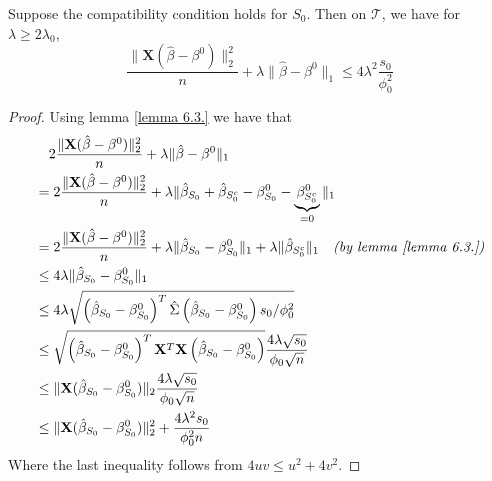 \begin{theorem}[Theorem 6.1.]
    Suppose the compatibility condition holds for $S_{0}$. Then on $\mathscr{T}$, we have for $\lambda \geq 2 \lambda_{0}$,
    $$
        \frac{\|\mathbf{X}(\hat{\beta}-\beta^{0})\|_{2}^{2}}{n}+\lambda\|\hat{\beta}-\beta^{0}\|_{1} \leq 4 \lambda^{2} \frac{s_{0}}{\phi_{0}^{2}}
    $$
\end{theorem}
\begin{proof}
    Using lemma \ref{lemma 6.3.} we have that
    \begin{align*}
         & \quad 2 \frac{\|\mathbf{X}(\hat{\beta}-\beta^{0})\|_{2}^{2}}{n} + \lambda\|\hat{\beta}-\beta^{0}\|_{1}                                                                                                   \\
         & = 2 \frac{\|\mathbf{X}(\hat{\beta}-\beta^{0})\|_{2}^{2}}{n} + \lambda \| \hat{\beta}_{S_0} + \hat{\beta}_{S_{0}^{c}} - \beta^{0}_{S_0} - \underbrace{\beta^{0}_{S_0^c}}_{=0} \|_{1}                      \\
         & = 2 \frac{\|\mathbf{X}(\hat{\beta}-\beta^{0})\|_{2}^{2}}{n} + \lambda \| \hat{\beta}_{S_0} - \beta^{0}_{S_0} \|_{1} + \lambda \| \hat{\beta}_{S_{0}^{c}} \|_1 \quad \textit{(by lemma \ref{lemma 6.3.})} \\
         & \leq 4 \lambda \|\hat{\beta}_{S_{0}} - \beta_{S_{0}}^{0} \|_{1}                                                                                                                                          \\
         & \leq 4 \lambda \sqrt{\left( \hat{\beta}_{S_{0}} - \beta_{S_{0}}^{0} \right)^{T} \hat{\Sigma} \left( \hat{\beta}_{S_{0}} - \beta_{S_{0}}^{0}  \right) s_{0} / \phi_{0}^{2}}                               \\
         & \leq \sqrt{\left( \hat{\beta}_{S_{0}} - \beta_{S_{0}}^{0} \right)^{T} \mathbf{X}^T \mathbf{X} \left( \hat{\beta}_{S_{0}} - \beta_{S_{0}}^{0}  \right)} \frac{4 \lambda \sqrt{s_{0}}}{\phi_{0} \sqrt{n}}                  \\
         & \leq \| \mathbf{X} ( \hat{\beta}_{S_{0}} - \beta_{S_{0}}^{0} ) \|_2 \frac{4 \lambda \sqrt{s_{0}}}{\phi_{0} \sqrt{n}}                                                                                             \\
         & \leq \| \mathbf{X} ( \hat{\beta}_{S_{0}} - \beta_{S_{0}}^{0} ) \|^2_2 + \frac{4 \lambda^2 s_{0}}{\phi^2_{0} n}                                                                                                   \\
    \end{align*}
    Where the last inequality follows from $4uv \leq u^2 + 4v^2$.
\end{proof}


